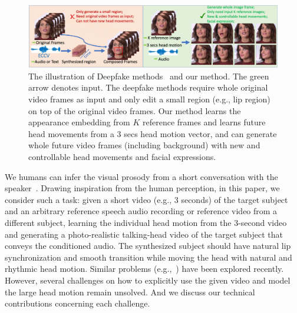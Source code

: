 \documentclass[runningheads]{llncs}
\begin{document}
\begin{figure}[t]
\includegraphics[width= \linewidth]{latex/images/teaser.png}
\caption{The illustration of Deepfake methods~\cite{suwajanakorn2017synthesizing,fried2019text} and our method. The green arrow denotes input. The deepfake methods require whole original video frames as input and only edit a small region (e.g., lip region) on top of the original video frames. Our method learns the appearance embedding from $K$ reference frames and learns future head movements from a 3 secs head motion vector, and can generate whole future video frames (including background) with new and controllable head movements and facial expressions.}
\label{fig:teaser}
\end{figure}

We humans can infer the visual prosody from a short conversation with the speaker~\cite{munhall2004visual}. Drawing inspiration from the human perception, in this paper, we consider such a task: given a short video (e.g., 3 seconds) of the target subject and an arbitrary reference speech audio recording or reference video from a different subject, learning the individual head motion from the 3-second video and generating a photo-realistic talking-head video of the target subject that conveys the conditioned audio. The synthesized subject should have natural lip synchronization and smooth transition while moving the head with natural and rhythmic head motion. Similar problems (e.g.,~\cite{chung2017you,zhou2019talking,ijcai2019-129,vougioukas2019realistic,chen2019hierarchical,wiles2018x2face,zakharov2019few,wang2018fewshotvid2vid}) have been explored recently. However, several challenges on how to explicitly use the given video and model the large head motion remain unsolved. And we discuss our technical contributions concerning each challenge.

\end{document}
